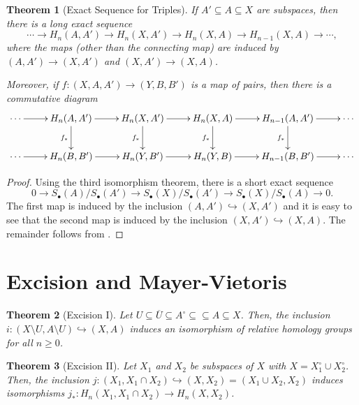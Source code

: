 \documentclass[10pt]{article}
\theoremstyle{thmstyle}
\newtheorem{theorem}{Theorem}[section]
\theoremstyle{defstyle}
\newcommand{\into}{\hookrightarrow}
\renewcommand{\ge}{\geqslant}
\newcommand{\sminus}{\setminus}
\begin{document}
\begin{theorem}[Exact Sequence for Triples]
    If $A'\subseteq A\subseteq X$ are subspaces, then there is a long exact sequence 
    \begin{equation*}
        \cdots\to H_n(A, A')\to H_n(X, A')\to H_n(X, A)\to H_{n - 1}(X, A)\to\cdots,
    \end{equation*}
    where the maps (other than the connecting map) are induced by $(A, A')\to (X, A')$ and $(X, A')\to (X, A)$. 

    Moreover, if $f: (X, A, A')\to (Y, B, B')$ is a map of pairs, then there is a commutative diagram 
    \begin{equation*}
        \xymatrix {
        \cdots\ar[r] & H_n(A, A')\ar[r]\ar[d]_{f_\ast} & H_n(X, A')\ar[r]\ar[d]_{f_\ast} & H_n(X, A)\ar[r]\ar[d]_{f_\ast} & H_{n - 1}(A, A')\ar[r]\ar[d]_{f_\ast} & \cdots\\
        \cdots\ar[r] & H_n(B, B')\ar[r] & H_n(Y, B')\ar[r] & H_n(Y, B)\ar[r] & H_{n - 1}(B, B')\ar[r] & \cdots
        }
    \end{equation*}
\end{theorem}
\begin{proof}
    Using the third isomorphism theorem, there is a short exact sequence 
    \begin{equation*}
        0\to S_\bullet(A)/S_\bullet(A')\to S_\bullet(X)/S_\bullet(A')\to S_\bullet(X)/S_\bullet(A)\to 0.
    \end{equation*}
    The first map is induced by the inclusion $(A, A')\into(X, A')$ and it is easy to see that the second map is induced by the inclusion $(X, A')\into(X, A)$. The remainder follows from .
\end{proof}

\section{Excision and Mayer-Vietoris}

\begin{theorem}[Excision I]
    Let $U\subseteq \overline U\subseteq A^\circ\subseteq\subseteq A\subseteq X$. Then, the inclusion $i: (X\sminus U, A\sminus U)\into (X, A)$ induces an isomorphism of relative homology groups for all $n\ge 0$.
\end{theorem}

\begin{theorem}[Excision II]
    Let $X_1$ and $X_2$ be subspaces of $X$ with $X = X_1^\circ\cup X_2^\circ$. Then, the inclusion $j: (X_1, X_1\cap X_2)\into(X, X_2) = (X_1\cup X_2, X_2)$ induces isomorphisms $j_\ast: H_n(X_1, X_1\cap X_2)\to H_n(X, X_2)$.
\end{theorem}
\end{document}
